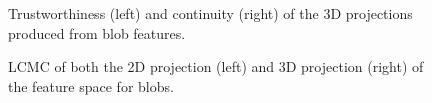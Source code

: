 \begin{figure}[H]
	\centering
	\caption{Trustworthiness (left) and continuity (right) of the 3D projections produced from blob features.}\label{fig:TC_3d_blobs}
\end{figure}

\begin{figure}[H]
	\centering
	\caption{LCMC of both the 2D projection (left) and 3D projection (right) of the feature space for blobs.}\label{fig:LCMC_blobs}
\end{figure}
\clearpage

